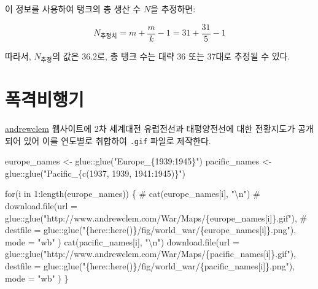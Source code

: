 \documentclass[
  letterpaper,
  chapter,a4paper,showtrims,openright,hidelinks]{oblivoir}
\newenvironment{Shaded}{\begin{snugshade}}{\end{snugshade}}
\newcommand{\AttributeTok}[1]{\textcolor[rgb]{0.40,0.45,0.13}{#1}}
\newcommand{\CommentTok}[1]{\textcolor[rgb]{0.37,0.37,0.37}{#1}}
\newcommand{\ControlFlowTok}[1]{\textcolor[rgb]{0.00,0.23,0.31}{#1}}
\newcommand{\DecValTok}[1]{\textcolor[rgb]{0.68,0.00,0.00}{#1}}
\newcommand{\FunctionTok}[1]{\textcolor[rgb]{0.28,0.35,0.67}{#1}}
\newcommand{\NormalTok}[1]{\textcolor[rgb]{0.00,0.23,0.31}{#1}}
\newcommand{\OtherTok}[1]{\textcolor[rgb]{0.00,0.23,0.31}{#1}}
\newcommand{\SpecialCharTok}[1]{\textcolor[rgb]{0.37,0.37,0.37}{#1}}
\newcommand{\StringTok}[1]{\textcolor[rgb]{0.13,0.47,0.30}{#1}}
\begin{document}
이 정보를 사용하여 탱크의 총 생산 수 \(N\)을 추정하면:

\[
N_{\text{추정치}} = m + \frac{m}{k} - 1 = 31 + \frac{31}{5} - 1
\]

따라서, \(N_{\text{추정}}\)의 값은 36.2로, 총 탱크 수는 대략 36 또는
37대로 추정될 수 있다.

\hypertarget{uxd3eduxaca9uxbe44uxd589uxae30}{%
\chapter{폭격비행기}\label{uxd3eduxaca9uxbe44uxd589uxae30}}

\href{http://www.andrewclem.com/War/}{andrewclem} 웹사이트에 2차
세계대전 유럽전선과 태평양전선에 대한 전황지도가 공개되어 있어 이를
연도별로 취합하여 \texttt{.gif} 파일로 제작한다.

\begin{Shaded}
\begin{Highlighting}[]
\NormalTok{europe\_names }\OtherTok{\textless{}{-}}\NormalTok{ glue}\SpecialCharTok{::}\FunctionTok{glue}\NormalTok{(}\StringTok{"Europe\_\{1939:1945\}"}\NormalTok{)}
\NormalTok{pacific\_names }\OtherTok{\textless{}{-}}\NormalTok{ glue}\SpecialCharTok{::}\FunctionTok{glue}\NormalTok{(}\StringTok{"Pacific\_\{c(1937, 1939, 1941:1945)\}"}\NormalTok{)}

\ControlFlowTok{for}\NormalTok{(i }\ControlFlowTok{in} \DecValTok{1}\SpecialCharTok{:}\FunctionTok{length}\NormalTok{(europe\_names)) \{}
  \CommentTok{\# cat(europe\_names[i], "\textbackslash{}n")}
  \CommentTok{\# download.file(url = glue::glue("http://www.andrewclem.com/War/Maps/\{europe\_names[i]\}.gif"),}
  \CommentTok{\#             destfile = glue::glue("\{here::here()\}/fig/world\_war/\{europe\_names[i]\}.png"), mode = "wb" )}
  \FunctionTok{cat}\NormalTok{(pacific\_names[i], }\StringTok{"}\SpecialCharTok{\textbackslash{}n}\StringTok{"}\NormalTok{)}
  \FunctionTok{download.file}\NormalTok{(}\AttributeTok{url =}\NormalTok{ glue}\SpecialCharTok{::}\FunctionTok{glue}\NormalTok{(}\StringTok{"http://www.andrewclem.com/War/Maps/\{pacific\_names[i]\}.gif"}\NormalTok{),}
              \AttributeTok{destfile =}\NormalTok{ glue}\SpecialCharTok{::}\FunctionTok{glue}\NormalTok{(}\StringTok{"\{here::here()\}/fig/world\_war/\{pacific\_names[i]\}.png"}\NormalTok{), }\AttributeTok{mode =} \StringTok{"wb"}\NormalTok{ )}
\NormalTok{\}}
\end{Highlighting}
\end{Shaded}
\end{document}
